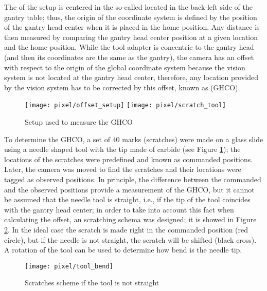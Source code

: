 The  of the setup is centered in the so-called  located in the back-left side of the gantry table; thus, the origin of the coordinate system is defined by the position of the gantry head center when it is placed in the home position. Any distance is then measured by comparing the gantry head center position at a given location and the home position. While the tool adapter is concentric to the gantry head (and then its coordinates are the same as the gantry), the camera has an offset with respect to the origin of the global coordinate system because the vision system is not located at the gantry head center, therefore, any location provided by the vision system has to be corrected by this offset, known as  (GHCO).

\begin{figure}[h]
\begin{center}
\texttt{[image: pixel/offset\_setup]}
\texttt{[image: pixel/scratch\_tool]}
\caption{Setup used to measure the GHCO}\label{fig:offset_setup}
\end{center}
\end{figure}

To determine the GHCO, a set of 40 marks (scratches) were made on a glass slide using a needle shaped tool with the tip made of carbide (see Figure \ref{fig:offset_setup}); the locations of the scratches were predefined and known as commanded positions. Later, the camera was moved to find the scratches and their locations were tagged as observed positions. In principle, the difference between the commanded and the observed positions provide a measurement of the GHCO, but it cannot be assumed that the needle tool is straight, i.e., if the tip of the tool coincides with the gantry head center; in order to take into account this fact when calculating the offset, an scratching schema was designed; it is showed in Figure \ref{tool_bend}. In the ideal case the scratch is made right in the commanded position (red circle), but if the needle is not straight, the scratch will be shifted (black cross). A rotation of the tool can be used to determine how bend is the needle tip.

\begin{figure}[h]
\begin{center}
\texttt{[image: pixel/tool\_bend]}
\caption{Scratches scheme if the tool is not straight }\label{tool_bend}
\end{center}
\end{figure}

